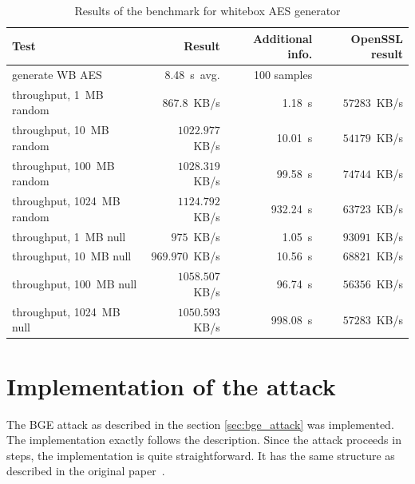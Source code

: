 \documentclass[11pt,oneside,final]{fithesis2}
\begin{document}
    \begin{table}[!htb]
    \begin{center}
    \begin{tabular}{ | l | r | r | r | }
	\hline
	Test                      & Result              &  Additional info.  & OpenSSL result             \\ \hline \hline
	generate WB AES           & 8.48~s~avg.         &  100 samples       &                             \\ \hline
	
	throughput, 1~MB    random   & $867.8$~KB/s     &  1.18~s            & $57283$~KB/s              \\ \hline
	throughput, 10~MB   random   & $1022.977$~KB/s  &  10.01~s           & $54179$~KB/s               \\ \hline
	throughput, 100~MB  random   & $1028.319$~KB/s  &  99.58~s           & $74744$~KB/s               \\ \hline
	throughput, 1024~MB random   & $1124.792$~KB/s  &  932.24~s          & $63723$~KB/s               \\ \hline
	
	throughput, 1~MB null       & $975$~KB/s        &  1.05~s            & $93091$~KB/s               \\ \hline
	throughput, 10~MB null      & $969.970$~KB/s    &  10.56~s           & $68821$~KB/s               \\ \hline
	throughput, 100~MB null     & $1058.507$~KB/s   &  96.74~s           & $56356$~KB/s               \\ \hline
	throughput, 1024~MB null    & $1050.593$~KB/s  &  998.08~s           & $57283$~KB/s               \\ \hline
    \end{tabular}
    \caption{Results of the benchmark for whitebox AES generator}
    \label{tbl:results_scheme_implementation}
    \end{center} 
    \end{table}
    

    \section{Implementation of the attack}\label{sec:bge_attack_impl}
    The BGE attack as described in the section \ref{sec:bge_attack} was implemented. The implementation exactly follows the description. Since
    the attack proceeds in steps, the implementation is quite straightforward. It has the same structure as described in the original paper~\citep{Billet:2004:CWB:2080787.2080809}.
    
\end{document}
